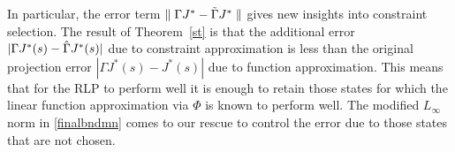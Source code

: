 In particular, the error term $\parallel\Gamma J^*-\tilde{\Gamma} J^* \parallel$ gives new insights into constraint selection. 
The result of Theorem~\ref{st} is that the additional error $|\Gamma J^*(s) -\hat{\Gamma} J^*(s)|$ due to constraint approximation is less than the original projection error $|\Gamma J^*(s)-J^*(s)|$ due to function approximation. This means that for the RLP to perform well it is enough to retain those states for which the linear function approximation via $\Phi$ is known to perform well. The modified $L_\infty$ norm in \eqref{finalbndmn} comes to our rescue to control the error due to those states that are not chosen.
\begin{comment}
\subsection{Comparison with ADP methods}
A host of the ADP methods such as \cite{lspi,lspe,lstd,Tsit} are based on solving the projected Bellman equation (PBE). The PBE based methods have been empirically successful and also have theoretical guarantees for the approximate value function. However, a significant shortcoming is that they suffer from the issue of \emph{policy-chattering} (see section~$6.4.3$ of \cite{BertB}), i.e., the sequence of policies might oscillate within a set of bad policies. A salient feature of the ALP based methods is that they find only one approximate value function $\tj$ and one sub-optimal policy derived as a greedy policy with respect to $\tj$. As a result there is no such issue of policy-chattering for the ALP based methods. By providing the error bounds for the GRLP, our paper provides the much required theoretical support for the RLP. Our GRLP framework closes the long-standing gap in the literature of providing a theoretical framework to bound the error due to constraint reduction in ALP based schemes.\\

\FloatBarrier
\begin{table}[H]
\resizebox{\columnwidth}{!}{
\begin{tabular}{|c|c|c|}\hline
ADP Method	&Empirical	&Theoretical\\\hline
Projected Bellman &\ding{51}    &\ding{53}-Policy Chattering\\
Equation	&	&\\\hline
ALP		&\ding{53}-Large number of Constraints &\ding{51}\\\hline
RLP		&\ding{51} &\ding{53}-  Only under\\
&&ideal assumptions\\\hline
\end{tabular}
}
\end{table}
\end{comment}
